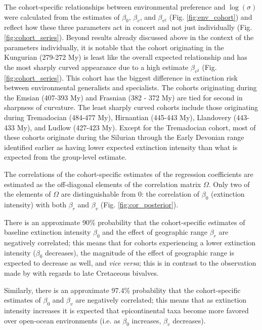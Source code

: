 \documentclass{article}
\begin{document}
The cohort-specific relationships between environmental preference and \(\log(\sigma)\) were calculated from the estimates of \(\beta_{0}\), \(\beta_{v}\), and \(\beta_{v^{2}}\) (Fig. \ref{fig:env_cohort}) and reflect how these three parameters act in concert and not just individually (Fig. \ref{fig:cohort_series}). Beyond results already discussed above in the context of the parameters individually, it is notable that the cohort originating in the Kungurian (279-272 My) is least like the overall expected relationship and has the most sharply curved appearance due to a high estimate \(\beta_{v^{2}}\) (Fig. \ref{fig:cohort_series}). This cohort has the biggest difference in extinction risk between environmental generalists and specialists. The cohorts originating during the Emsian (407-393 My) and Frasnian (382 - 372 My) are tied for second in sharpness of curvature. The least sharply curved cohorts include those originating during Tremadocian (484-477 My), Hirnantian (445-443 My), Llandovery (443-433 My), and Ludlow (427-423 My). Except for the Tremadocian cohort, most of these cohorts originate during the Silurian through the Early Devonian range identified earlier as having lower expected extinction intensity than what is expected from the group-level estimate.

The correlations of the cohort-specific estimates of the regression coefficients are estimated as the off-diagonal elements of the correlation matrix \(\Omega\). Only two of the elements of \(\Omega\) are distinguishable from 0: the correlation of \(\beta_{0}\) (extinction intensity) with both \(\beta_{r}\) and \(\beta_{v}\) (Fig. \ref{fig:cor_posterior}). 

There is an approximate 90\% probability that the cohort-specific estimates of baseline extinction intensity \(\beta_{0}\) and the effect of geographic range \(\beta_{r}\) are negatively correlated; this means that for cohorts experiencing a lower extinction intensity (\(\beta_{0}\) decreases), the magnitude of the effect of geographic range is expected to decrease as well, and \textit{vice versa}; this is in contrast to the observation made by \citet{Jablonski1986} with regards to late Cretaceous bivalves.

Similarly, there is an approximate 97.4\% probability that the cohort-specific estimates of \(\beta_{0}\) and \(\beta_{v}\) are negatively correlated; this means that as extinction intensity increases it is expected that epicontinental taxa become more favored over open-ocean environments (i.e. as \(\beta_{0}\) increases, \(\beta_{v}\) decreases). 
\end{document}
